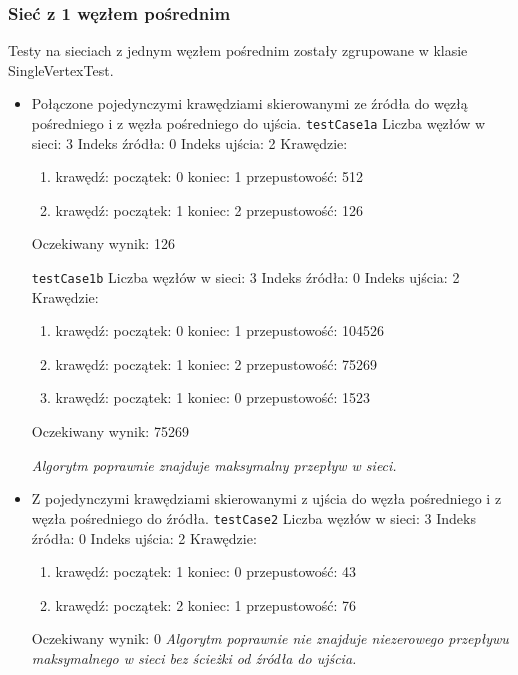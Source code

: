 \subsubsection{Sieć z 1 węzłem pośrednim}
Testy na sieciach z jednym węzłem pośrednim zostały zgrupowane
w klasie SingleVertexTest.
\begin{itemize}[nosep]
    \item Połączone pojedynczymi krawędziami skierowanymi ze źródła do węzłą
    pośredniego i z węzła pośredniego do ujścia.
    \texttt{testCase1a}
    Liczba węzłów w sieci: 3
    Indeks źródła: 0
    Indeks ujścia: 2
    Krawędzie:
    \begin{enumerate}[nosep]
        \item krawędź:
        początek: 0
        koniec: 1
        przepustowość: 512
        \item krawędź:
        początek: 1
        koniec: 2
        przepustowość: 126
    \end{enumerate}
    Oczekiwany wynik: 126

    \texttt{testCase1b}
    Liczba węzłów w sieci: 3
    Indeks źródła: 0
    Indeks ujścia: 2
    Krawędzie:
    \begin{enumerate}[nosep]
        \item krawędź:
        początek: 0
        koniec: 1
        przepustowość: 104526
        \item krawędź:
        początek: 1
        koniec: 2
        przepustowość: 75269
        \item krawędź:
        początek: 1
        koniec: 0
        przepustowość: 1523
    \end{enumerate}
    Oczekiwany wynik: 75269

    \emph{Algorytm poprawnie
    znajduje maksymalny przepływ w sieci.}

    \item Z pojedynczymi krawędziami skierowanymi z ujścia do węzła pośredniego
    i z węzła pośredniego do źródła.
    \texttt{testCase2}
    Liczba węzłów w sieci: 3
    Indeks źródła: 0
    Indeks ujścia: 2
    Krawędzie:
    \begin{enumerate}[nosep]
        \item krawędź:
        początek: 1
        koniec: 0
        przepustowość: 43
        \item krawędź:
        początek: 2
        koniec: 1
        przepustowość: 76
    \end{enumerate}
    Oczekiwany wynik: 0
    \emph{Algorytm poprawnie nie znajduje niezerowego
    przepływu maksymalnego w sieci bez ścieżki od źródła do ujścia.}


\end{itemize}
